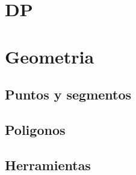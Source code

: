 \documentclass{article}
\begin{document}
	\section{DP}
	
	
	
	
	
	
	
	
	

	\section{Geometria}
	\subsection{Puntos y segmentos}
	
	
	
	
	

	\subsection{Poligonos}
	
	
	
	

	\subsection{Herramientas}
	
	
	
	

%	
\end{document}
